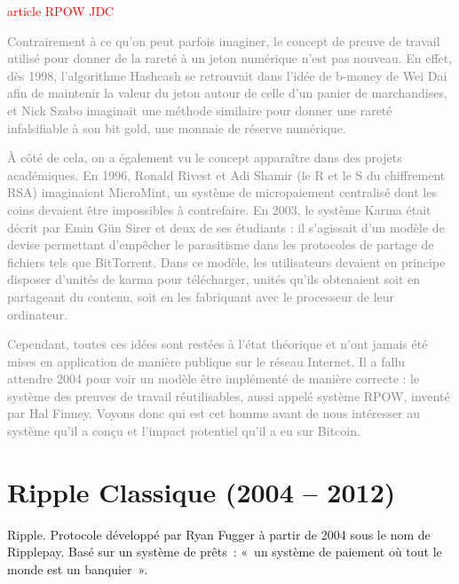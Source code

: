 \textcolor{red}{article RPOW JDC}

\textcolor{gray}{Contrairement à ce qu'on peut parfois imaginer, le concept de preuve de travail utilisé pour donner de la rareté à un jeton numérique n'est pas nouveau. En effet, dès 1998, l'algorithme Hashcash se retrouvait dans l'idée de b-money de Wei Dai afin de maintenir la valeur du jeton autour de celle d'un panier de marchandises, et Nick Szabo imaginait une méthode similaire pour donner une rareté infalsifiable à son bit gold, une monnaie de réserve numérique.}

\textcolor{gray}{À côté de cela, on a également vu le concept apparaître dans des projets académiques. En 1996, Ronald Rivest et Adi Shamir (le R et le S du chiffrement RSA) imaginaient MicroMint, un système de micropaiement centralisé dont les coins devaient être impossibles à contrefaire. En 2003, le système Karma était décrit par Emin Gün Sirer et deux de ses étudiants : il s'agissait d'un modèle de devise permettant d'empêcher le parasitisme dans les protocoles de partage de fichiers tels que BitTorrent. Dans ce modèle, les utilisateurs devaient en principe disposer d'unités de karma pour télécharger, unités qu'ils obtenaient soit en partageant du contenu, soit en les fabriquant avec le processeur de leur ordinateur.}

\textcolor{gray}{Cependant, toutes ces idées sont restées à l'état théorique et n'ont jamais été mises en application de manière publique sur le réseau Internet. Il a fallu attendre 2004 pour voir un modèle être implémenté de manière correcte : le système des preuves de travail réutilisables, aussi appelé système RPOW, inventé par Hal Finney. Voyons donc qui est cet homme avant de nous intéresser au système qu'il a conçu et l'impact potentiel qu'il a eu sur Bitcoin.}





\section{Ripple Classique (2004 -- 2012)}

Ripple. Protocole développé par Ryan Fugger à partir de 2004 sous le nom de Ripplepay. Basé sur un système de prêts~: «~un système de paiement où tout le monde est un banquier~».

